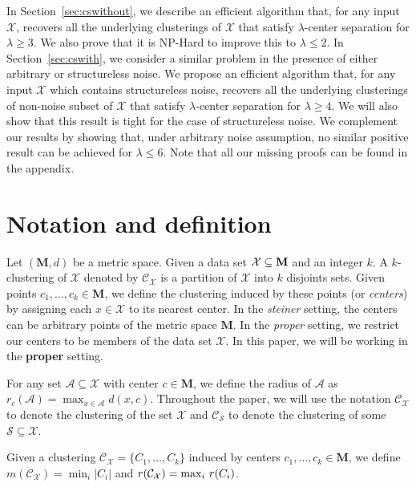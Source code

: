 \documentclass[orivec]{llncs}
\newcommand{\mc}{\mathcal}
\newcommand{\mb}{\mathbf}
\begin{document}
In Section~\ref{sec:cswithout}, we describe an efficient algorithm that, for any input $\mc X$, recovers all the underlying clusterings of $\mc X$ that satisfy $\lambda$-center separation for $\lambda \geq 3$. We also prove that it is NP-Hard to improve this to $\lambda \leq 2$. In Section~\ref{sec:cswith}, we consider a similar problem in the presence of either arbitrary or structureless noise. We propose an efficient algorithm that, for any input $\mc X$ which contains structureless noise, recovers all the underlying clusterings of non-noise subset of $\mc X$ that satisfy $\lambda$-center separation for $\lambda \geq 4$. We will also show that this result is tight for the case of structureless noise. We complement our results by showing that, under arbitrary noise assumption, no similar positive result can be achieved for $\lambda \leq 6$. Note that all our missing proofs can be found in the appendix.

\section{Notation and definition}
\label{sec:Notation}
Let $(\mb M, d)$ be a metric space. Given a data set $\mc X \subseteq \bf M$ and an integer $k$. A $k$-clustering of $\mc X$ denoted by $\mc C_{\mc X}$ is a partition of $\mc X$ into $k$ disjoints sets. Given points $c_1, \ldots, c_k \in \mb M$, we define the clustering induced by these points (or {\it centers}) by assigning each $x \in \mc X$ to its nearest center. In the {\it steiner} setting, the centers can be arbitrary points of the metric space $\mb M$. In the {\it proper} setting, we restrict our centers to be members of the data set $\mc X$. In this paper, we will be working in the {\bf proper} setting.

For any set $\mc A\subseteq \mc X$ with center $c\in \mb M$, we define the radius of $\mc A$ as $r_c(\mc A) = \max_{x \in \mc A} d(x, c)$. Throughout the paper, we will use the notation $\mc C_{\mc X}$ to denote the clustering of the set $\mc X$ and $\mc C_{\mc S}$ to denote the clustering of some $\mc S\subseteq \mc X$. 

\begin{definition}[$r(\mc C_{\mc X})$ , $m(\mc C_{\mc X})$] Given a clustering $\mc C_{\mc X} = \{C_1, \ldots, C_k\}$ induced by centers $c_1, \ldots, c_k \in \mb M$, we define $m(\mc{C}_{\mc{X}}) = \min_i |C_i|$ and $r(\mc{C}_{\mc{X}}) = \max_i \thinspace r(C_i)$.
\end{definition}
\end{document}
